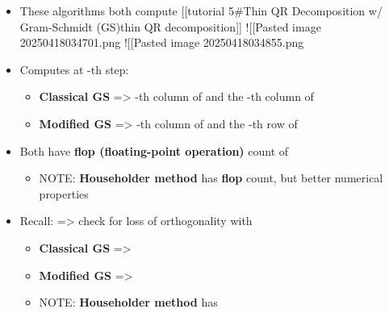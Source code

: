\begin{itemize}

\item
  These algorithms both compute {[}{[}tutorial 5\#Thin QR Decomposition
  w/ Gram-Schmidt (GS)\textbar thin QR decomposition{]}{]} !{[}{[}Pasted
  image 20250418034701.png\textbar400{]}{]} !{[}{[}Pasted image
  20250418034855.png\textbar400{]}{]}
\item
  Computes at -th step:

  \begin{itemize}
  
  \item
    \textbf{Classical GS} =\textgreater{} -th column of
     and the -th column of 
  \item
    \textbf{Modified GS} =\textgreater{} -th column of
     and the -th row of 
  \end{itemize}
\item
  Both have \textbf{flop (floating-point operation)} count of

  \begin{itemize}
  
  \item
    NOTE: \textbf{Householder method} has
     \textbf{flop} count,
    but better numerical properties
  \end{itemize}
\item
  Recall:  =\textgreater{}
  check for loss of orthogonality with

  \begin{itemize}
  
  \item
    \textbf{Classical GS} =\textgreater{}
  \item
    \textbf{Modified GS} =\textgreater{}
  \item
    NOTE: \textbf{Householder method} has
  \end{itemize}
\end{itemize}

